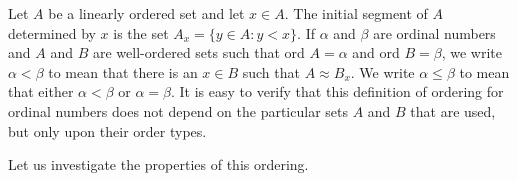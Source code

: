 Let $A$ be a linearly ordered set and let $x \in A$. The initial segment of $A$ determined by $x$ is the set $A_x = \{y \in A : y < x\}$. If $\alpha$ and $\beta$ are ordinal numbers and $A$ and $B$ are well-ordered sets such that ord $A = \alpha$ and ord $B = \beta$, we write $\alpha < \beta$ to mean that there is an $x \in B$ such that $A \approx B_x$. We write $\alpha \leq \beta$ to mean that either $\alpha < \beta$ or $\alpha = \beta$. It is easy to verify that this definition of ordering for ordinal numbers does not depend on the particular sets $A$ and $B$ that are used, but only upon their order types.

Let us investigate the properties of this ordering.